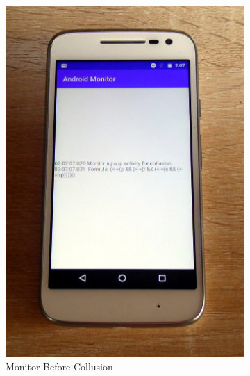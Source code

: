 \begin{figure}[H]
\begin{subfigure}{0.49\textwidth}
		\includegraphics[height=0.45\textheight]{graphics/PhonePhotos/06 - MonitorBefore.jpg}
		\caption{Monitor Before Collusion}
		\label{fig:MonitorBefore}
	\end{subfigure}
\\
	\begin{subfigure}{0.49\textwidth}
		\centering

\end{subfigure}
\end{figure}
